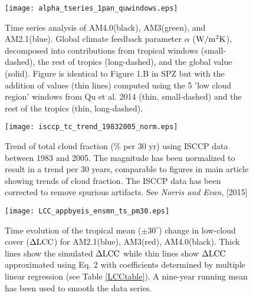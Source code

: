 \documentclass[draft,grl]{agutexSI}
\begin{document}

%
 
 \begin{figure}
 \texttt{[image: alpha\_tseries\_1pan\_quwindows.eps]}
 \caption{Time series analysis of AM4.0(black), AM3(green), and AM2.1(blue). Global climate feedback parameter $\alpha$ ($\rm{W/m^2 K}$),  
  decomposed into contributions from tropical windows (small-dashed), the rest of tropics (long-dashed), and the global value (solid).  Figure is identical to Figure 1.B in SPZ
  but with the addition of values (thin lines) computed using the 5 'low cloud region' windows from Qu et al. 2014 (thin, small-dashed) and the rest of the tropics (thin, long-dashed).}
   \label{fig:quwindows}
 \end{figure}
 
 \begin{figure}
  \texttt{[image: isccp\_tc\_trend\_19832005\_norm.eps]}
  \caption{Trend of total cloud fraction (\% per 30 yr) using ISCCP data between 1983 and 2005.  The magnitude has been normalized to result in a trend per 30 years, comparable to figures in main article showing trends of cloud fraction.  The ISCCP data has been corrected to remove spurious artifacts.  See \textit{Norris and Evan}, [2015]}
  \label{fig:isccp}
\end{figure}

\begin{figure}
  \texttt{[image: LCC\_appbyeis\_ensmn\_ts\_pm30.eps]}
  \caption{Time evolution of the tropical mean ($\pm 30^{\circ}$) change in low-cloud cover ($\Delta \rm{LCC}$) for AM2.1(blue), AM3(red), AM4.0(black).  Thick lines show the       simulated $\Delta \rm{LCC}$ while thin lines show $\Delta \rm{LCC}$ approximated using Eq. 2 with coefficients determined by multiple linear regression (see Table \ref{LCCtable}).  A nine-year running mean has been used to smooth the data series.}
  \label{fig:lccts_pm30}
\end{figure}
\end{document}
